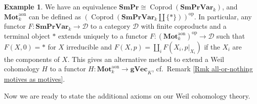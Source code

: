 \documentclass[11pt]{amsart}
\theoremstyle{definition}
\newtheorem{Ex}[Thm]{Example}
\newcommand{\op}{^{\operatorname{op}}}
\newcommand{\gVec}{\mathbf{gVec}}
\newcommand{\SmPr}{\mathbf{SmPr}}
\newcommand{\SmPrVar}{\mathbf{SmPrVar}}
\newcommand{\M}{\mathbf{Mot}}
\newcommand{\aon}{^{\text{aon}}}
\begin{document}
\begin{Ex}\label{Ex Coprod}
We have an equivalence $\SmPr \cong
\operatorname{Coprod}(\SmPrVar_k)$, and $\M_k\aon$ can be defined as
$(\operatorname{Coprod}(\SmPrVar_k \amalg \{*\}))\op$. In
particular, any functor $F \colon \SmPrVar_k \to \mathscr D$ to a
category $\mathscr D$ with finite coproducts and a terminal object
$*$ extends uniquely to a functor $F \colon (\M_k\aon)\op \to
\mathscr D$ such that $F(X,0) = *$ for $X$ irreducible and $F(X,p) =
\coprod_i F(X_i, p|_{X_i})$ if the $X_i$ are the components of $X$.
This gives an alternative method to extend a Weil cohomology $H$ to
a functor $H \colon \M_k\aon \to \gVec_K$, cf.~Remark \ref{Rmk
all-or-nothing motives as motives}.
\end{Ex}

Now we are ready to state the additional axioms on our Weil
cohomology theory.
\end{document}
